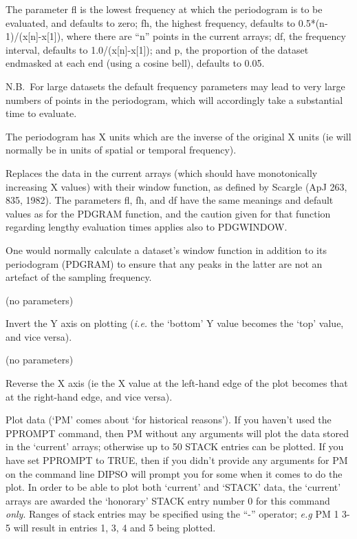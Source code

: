 \begin {description}
The parameter fl is the lowest frequency at which the periodogram is
to be evaluated, and defaults to zero;  fh, the highest frequency,
defaults to 0.5*(n-1)/(x[n]-x[1]), where there are ``n'' points in the
current arrays;  df, the frequency interval, defaults to
1.0/(x[n]-x[1]);  and p, the proportion of the dataset endmasked at
each end (using a cosine bell), defaults to 0.05.

N.B.\ For large datasets the default frequency parameters may lead to
very large numbers of points in the periodogram, which will
accordingly take a substantial time to evaluate.

The periodogram has X units which are the inverse of the original X
units (ie will normally be in units of spatial or temporal frequency).

\item [PDGWINDOW] [fl fh df]

Replaces the data in the current arrays (which should have
monotonically increasing X values) with their window function, as
defined by Scargle (ApJ 263, 835, 1982). The parameters fl, fh, and df
have the same meanings and default values as for the PDGRAM function,
and the caution given for that function regarding lengthy evaluation
times applies also to PDGWINDOW.

One would normally calculate a dataset's window function in addition
to its periodogram (PDGRAM) to ensure that any peaks in the latter are
not an artefact of the sampling frequency.

\item [PLOTINV] (no parameters)

Invert the Y axis on plotting ({\em i.e.} the `bottom' Y value becomes
the `top' value, and vice versa).

\item [PLOTREV] (no parameters)

Reverse the X axis (ie the X value at the left-hand edge of the plot
becomes that at the right-hand edge, and vice versa).

\item [PM] [n1 n2 n3  ..... n48 n49 n50]

Plot data (`PM' comes about `for historical reasons'). If you haven't
used the PPROMPT command, then PM without any arguments will plot the
data stored in the `current' arrays;  otherwise up to 50 STACK entries
can be plotted. If you have set PPROMPT to TRUE, then if you didn't
provide any arguments for PM on the command line DIPSO will prompt you
for some when it comes to do the plot. In order to be able to plot
both `current' and `STACK' data, the `current' arrays are awarded the
`honorary' STACK entry number 0 for this command {\em only}. Ranges of
stack entries may be specified using the ``-'' operator; {\em e.g} PM 1 3-5
will result in entries 1, 3, 4 and 5 being plotted.


\end{description}
